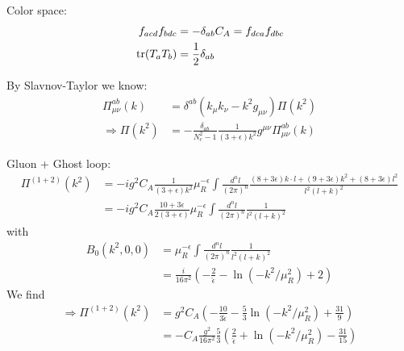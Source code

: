 Color space:
\begin{align}
f_{acd}f_{bdc} &= -\delta_{ab} C_A = f_{dca}f_{dbc}\\
\operatorname{\text{tr}}(T_aT_b) &= \frac 1 2 \delta_{ab}
\end{align}

By Slavnov-Taylor we know:
\begin{align}
\Pi_{\mu\nu}^{ab}(k) &= \delta^{ab}(k_\mu k_\nu-k^2g_{\mu\nu})\Pi(k^2)\\
\Rightarrow \Pi(k^2) &= -\frac{\delta_{ab}}{N_c^2-1}\frac 1 {(3+\epsilon)k^2}g^{\mu\nu}\Pi_{\mu\nu}^{ab}(k)
\end{align}

Gluon + Ghost loop:
\begin{align}
\Pi^{(1+2)}(k^2) &= -ig^2C_A\frac {1} {(3+\epsilon)k^2}\mu_R^{-\epsilon}\!\!\int\!\!\frac{d^nl}{(2\pi)^n} \frac{(8+3\epsilon)k\cdot l+(9+3\epsilon)k^2+(8+3\epsilon)l^2}{l^2(l+k)^2}\\
&= -ig^2C_A\frac {10+3\epsilon} {2(3+\epsilon)}\mu_R^{-\epsilon}\!\!\int\!\!\frac{d^nl}{(2\pi)^n} \frac{1}{l^2(l+k)^2}
\end{align}
with
\begin{align}
B_0(k^2,0,0) &= \mu_R^{-\epsilon}\!\!\int\!\!\frac{d^nl}{(2\pi)^n} \frac{1}{l^2(l+k)^2}\\
 &=\frac{i}{16\pi^2}\left(-\frac 2 {\hat\epsilon} -\ln(-k^2/\mu_R^2) + 2\right)
\end{align}
We find
\begin{align}
\Rightarrow \Pi^{(1+2)}(k^2) &= g^2C_A\left(-\frac {10} {3\hat\epsilon} - \frac 5 3\ln(-k^2/\mu_R^2) +\frac{31}{9}\right)\\
 &=-C_A\frac{g^2}{16\pi^2}\frac{5}{3}\left(\frac {2} {\hat\epsilon} + \ln(-k^2/\mu_R^2) -\frac{31}{15}\right)
\end{align}

